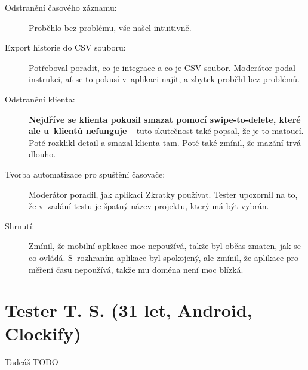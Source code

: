 \begin{description}
\item[Odstranění časového záznamu:] Proběhlo bez problému, vše našel intuitivně.
\item[Export historie do CSV souboru:] Potřeboval poradit, co je integrace a co je CSV soubor. Moderátor podal instrukci, ať se to pokusí v~aplikaci najít, a zbytek proběhl bez problémů.
\item[Odstranění klienta:] \textbf{Nejdříve se klienta pokusil smazat pomocí swipe-to-delete, které ale u~klientů nefunguje} – tuto skutečnost také popsal, že je to matoucí. Poté rozklikl detail a smazal klienta tam. Poté také zmínil, že mazání trvá dlouho.
\item[Tvorba automatizace pro spuštění časovače:] Moderátor poradil, jak aplikaci Zkratky používat. Tester upozornil na to, že v~zadání testu je špatný název projektu, který má být vybrán.
\item[Shrnutí:] Zmínil, že mobilní aplikace moc nepoužívá, takže byl občas zmaten, jak se co ovládá. S~rozhraním aplikace byl spokojený, ale zmínil, že aplikace pro měření času nepoužívá, takže mu doména není moc blízká.
\end{description}

\section*{Tester T. S. (31 let, Android, Clockify)}

Tadeáš TODO

